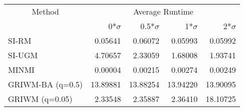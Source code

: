 
\begin{tabular}{lrrrr}
\toprule
\multicolumn{1}{c}{Method} & \multicolumn{4}{c}{Average Runtime} \\
 & 0*$\sigma$ & 0.5*$\sigma$ & 1*$\sigma$ & 2*$\sigma$\\
\midrule
SI-RM & 0.05641 & 0.06072 & 0.05993 & 0.05992\\
SI-UGM & 4.70657 & 2.33059 & 1.68008 & 1.93741\\
MINMI & 0.00004 & 0.00215 & 0.00274 & 0.00249\\
GRIWM-BA (q=0.5) & 13.89881 & 13.88254 & 13.94220 & 13.90095\\
GRIWM (q=0.05) & 2.33548 & 2.35887 & 2.36410 & 18.10725\\
\bottomrule
\end{tabular}
